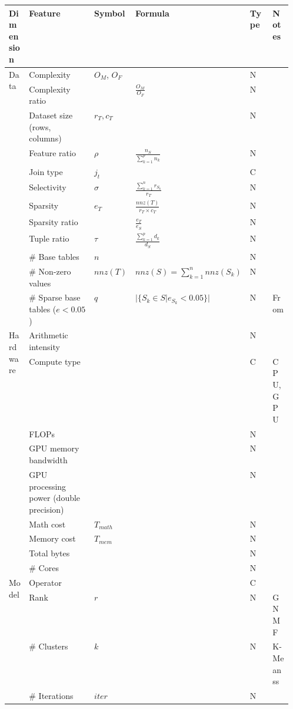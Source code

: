 \begin{tabular}{lp{0.23\linewidth}p{0.10\linewidth}>{\footnotesize}p{0.15\linewidth}p{0.08\linewidth}l}
\toprule
Dimension & Feature & Symbol & Formula & Type & Notes \\
\midrule\midrule
\multirow[t]{12}{*}{Data} & Complexity  & $O_M$, $O_F$ &  & N &  \\
 & Complexity ratio &  & $\frac{O_M}{ O_F}$ & N &  \\
 & Dataset size (rows, columns) & $r_T, c_T$ &  & N &  \\
 & Feature ratio & $\rho$ & $\frac{n_S}{\sum_{k=1}^p n_k} $ & N &  \\
 & Join type & $j_t$ &  & C &  \\
 & Selectivity & $\sigma$ & $\frac{\sum_{k=1}^{n}r_{S_k}}{r_T}$ & N &  \\
 & Sparsity & $e_T$ & $\frac{nnz(T)}{r_T\times c_T}$ & N &  \\
 & Sparsity ratio &  & $\frac{e_T}{e_S}$ & N &  \\
 & Tuple ratio & $\tau$ & $\frac{\sum_{k=1}^p d_k}{d_S}$ & N &  \\
 & \# Base tables & $n$ &  & N &  \\
 & \# Non-zero values & $nnz(T)$ & $nnz(S) = \sum_{k=1}^{n}nnz(S_k)$ & N &  \\
 & \# Sparse base tables ($e < 0.05$) & $q$ & $|\{S_k \in S| e_{S_k} < 0.05\}|$ & N & From \cite{MorpheusFI} \\

\multirow[t]{9}{*}{Hardware} & Arithmetic intensity &  &  & N &  \\
 & Compute type &  &  & C & CPU, GPU \\
 & FLOPs &  &  & N &  \\
 & GPU memory bandwidth &  &  & N &  \\
 & GPU processing power (double precision) &  &  & N &  \\
 & Math cost & $T_{math}$ &  & N &  \\
 & Memory cost & $T_{mem}$ &  & N &  \\
 & Total bytes &  &  & N &  \\
 & \# Cores &  &  & N &  \\

\multirow[t]{4}{*}{Model} & Operator &  &  & C &  \\
 & Rank & $r$ &  & N & GNMF \\
 & \# Clusters & $k$ &  & N & K-Meanss \\
 & \# Iterations & $iter$ &  & N &  \\

\bottomrule
\end{tabular}
